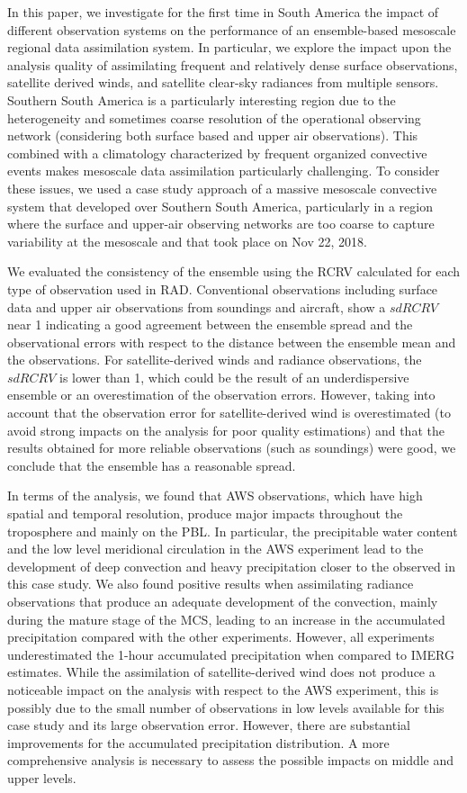 \documentclass[final,5p,times,twocolumn,authoryear]{elsarticle} %
\begin{document}
In this paper, we investigate for the first time in South America the impact of different observation systems on the performance of an ensemble-based mesoscale regional data assimilation system. In particular, we explore the impact upon the analysis quality of assimilating frequent and relatively dense surface observations, satellite derived winds, and satellite clear-sky radiances from multiple sensors. Southern South America is a particularly interesting region due to the heterogeneity and sometimes coarse resolution of the operational observing network (considering both surface based and upper air observations). This combined with a climatology characterized by frequent organized convective events makes mesoscale data assimilation particularly challenging. To consider these issues, we used a case study approach of a massive mesoscale convective system that developed over Southern South America, particularly in a region where the surface and upper-air observing networks are too coarse to capture variability at the mesoscale and that took place on Nov 22, 2018.

We evaluated the consistency of the ensemble using the RCRV calculated for each type of observation used in RAD. Conventional observations including surface data and upper air observations from soundings and aircraft, show a \(sd RCRV\) near 1 indicating a good agreement between the ensemble spread and the observational errors with respect to the distance between the ensemble mean and the observations. For satellite-derived winds and radiance observations, the \(sd RCRV\) is lower than 1, which could be the result of an underdispersive ensemble or an overestimation of the observation errors. However, taking into account that the observation error for satellite-derived wind is overestimated (to avoid strong impacts on the analysis for poor quality estimations) and that the results obtained for more reliable observations (such as soundings) were good, we conclude that the ensemble has a reasonable spread.

In terms of the analysis, we found that AWS observations, which have high spatial and temporal resolution, produce major impacts throughout the troposphere and mainly on the PBL. In particular, the precipitable water content and the low level meridional circulation in the AWS experiment lead to the development of deep convection and heavy precipitation closer to the observed in this case study. We also found positive results when assimilating radiance observations that produce an adequate development of the convection, mainly during the mature stage of the MCS, leading to an increase in the accumulated precipitation compared with the other experiments. However, all experiments underestimated the 1-hour accumulated precipitation when compared to IMERG estimates. While the assimilation of satellite-derived wind does not produce a noticeable impact on the analysis with respect to the AWS experiment, this is possibly due to the small number of observations in low levels available for this case study and its large observation error. However, there are substantial improvements for the accumulated precipitation distribution. A more comprehensive analysis is necessary to assess the possible impacts on middle and upper levels.
\end{document}
